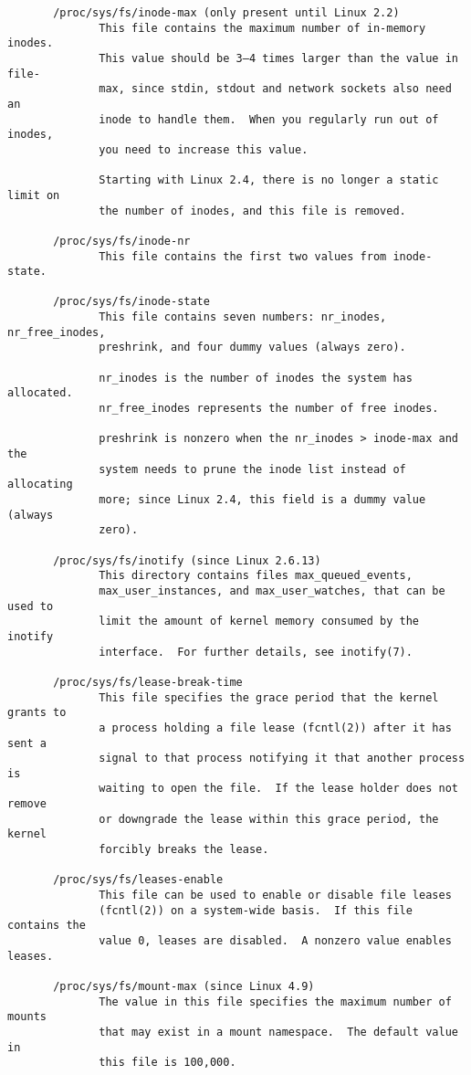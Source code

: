 \documentclass[]{article}
\begin{document}
\begin{verbatim}
       /proc/sys/fs/inode-max (only present until Linux 2.2)
              This file contains the maximum number of in-memory inodes.
              This value should be 3–4 times larger than the value in file-
              max, since stdin, stdout and network sockets also need an
              inode to handle them.  When you regularly run out of inodes,
              you need to increase this value.

              Starting with Linux 2.4, there is no longer a static limit on
              the number of inodes, and this file is removed.

       /proc/sys/fs/inode-nr
              This file contains the first two values from inode-state.

       /proc/sys/fs/inode-state
              This file contains seven numbers: nr_inodes, nr_free_inodes,
              preshrink, and four dummy values (always zero).

              nr_inodes is the number of inodes the system has allocated.
              nr_free_inodes represents the number of free inodes.

              preshrink is nonzero when the nr_inodes > inode-max and the
              system needs to prune the inode list instead of allocating
              more; since Linux 2.4, this field is a dummy value (always
              zero).

       /proc/sys/fs/inotify (since Linux 2.6.13)
              This directory contains files max_queued_events,
              max_user_instances, and max_user_watches, that can be used to
              limit the amount of kernel memory consumed by the inotify
              interface.  For further details, see inotify(7).

       /proc/sys/fs/lease-break-time
              This file specifies the grace period that the kernel grants to
              a process holding a file lease (fcntl(2)) after it has sent a
              signal to that process notifying it that another process is
              waiting to open the file.  If the lease holder does not remove
              or downgrade the lease within this grace period, the kernel
              forcibly breaks the lease.

       /proc/sys/fs/leases-enable
              This file can be used to enable or disable file leases
              (fcntl(2)) on a system-wide basis.  If this file contains the
              value 0, leases are disabled.  A nonzero value enables leases.

       /proc/sys/fs/mount-max (since Linux 4.9)
              The value in this file specifies the maximum number of mounts
              that may exist in a mount namespace.  The default value in
              this file is 100,000.


\end{verbatim}
\end{document}
